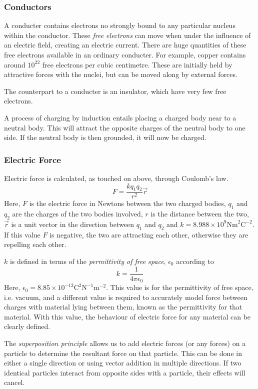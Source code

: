 \documentclass[12pt]{report}
\begin{document}
\subsubsection*{Conductors}
A conducter contains electrons no strongly bound to any particular nucleus 
within the conductor. These \textit{free electrons} can move when under the
influence of an electric field, creating an electric current. There are huge
quantities of these free electrons available in an ordinary conducter. For
example, copper contains around \(10^{22}\) free electrons per cubic 
centimetre. These are initially held by attractive forces with the nuclei, but
can be moved along by external forces.

\bigskip
The counterpart to a conducter is an insulator, which have very few free 
electrons.

\bigskip
A process of charging by induction entails placing a charged body near to a
neutral body. This will attract the opposite charges of the neutral body to one
side. If the neutral body is then grounded, it will now be charged.

\subsubsection*{Electric Force}
Electric force is calculated, as touched on above, through Coulomb's law.
\[F = \frac{kq_1q_2}{r^2}\vec{r}\]
Here, \(F\) is the electric force in Newtons between the two charged bodies,
\(q_1\) and \(q_2\) are the charges of the two bodies involved, \(r\) is the
distance between the two, \(\vec{r}\) is a unit vector in the direction
between \(q_1\) and \(q_2\) and 
\(k = 8.988\times10^9\mathrm{Nm}^2\mathrm{C}^{-2}\). If this value \(F\) is
negative, the two are attracting each other, otherwise they are repelling each
other.

\bigskip
\(k\) is defined in terms of the \textit{permittivity of free space}, 
\(\epsilon_0\) according to
\[k = \frac{1}{4\pi\epsilon_0}\]
Here, \(\epsilon_0 = 8.85\times10^{-12}\mathrm{C^2N^{-1}m^{-2}}\). This value
is for the permittivity of free space, i.e. vacuum, and a different value is
required to accurately model force between charges with material lying between
them, known as the permittivity for that material. With this value, the 
behaviour of electric force for any material can be clearly defined.

\bigskip
The \textit{superposition principle} allows us to add electric forces (or any
forces) on a particle to determine the resultant force on that particle. This
can be done in either a single direction or using vector addition in multiple
directions. If two identical particles interact from opposite sides with a
particle, their effects will cancel.
\end{document}
